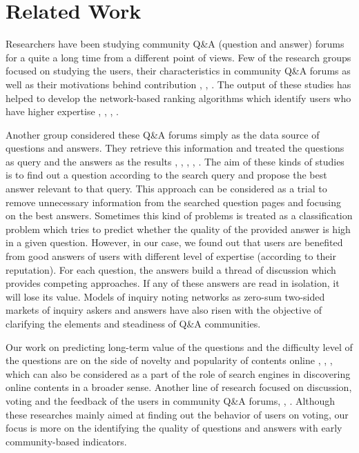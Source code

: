 \section{Related Work}
Researchers have been studying community Q\&A (question and answer) forums for a quite a long time from a different point of views. Few of the research groups focused on studying the users, their characteristics in community Q\&A forums as well as their motivations behind contribution \cite{adamic2008knowledge}, \cite{preece2004top}, \cite{nam2009questions}. The output of these studies has helped to develop the network-based ranking algorithms which identify users who have higher expertise \cite{jurczyk2007discovering}, \cite{nam2009questions}, \cite{yang2008crowdsourcing}, \cite{zhang2007expertise}.

Another group considered these Q\&A forums simply as the data source of questions and answers. They retrieve this information and treated the questions as query and the answers as the results \cite{liu2011predicting}, \cite{harper2008predictors}, \cite{liu2008predicting}, \cite{agichtein2009modeling}, \cite{jeon2006framework}. The aim of these kinds of studies is to find out a question according to the search query and propose the best answer relevant to that query. This approach can be considered as a trial to remove unnecessary information from the searched question pages and focusing on the best answers. Sometimes this kind of problems is treated as a classification problem which tries to predict whether the quality of the provided answer is high \cite{shah2010evaluating} in a given question. However, in our case, we found out that users are benefited from good answers of users with different level of expertise (according to their reputation). For each question, the answers build a thread of discussion which provides competing approaches. If any of these answers are read in isolation, it will lose its value. Models of inquiry noting networks as zero-sum two-sided markets of inquiry askers and answers have also risen \cite{kumar2010evolution} with the objective of clarifying the elements and steadiness of Q\&A communities.

Our work on predicting long-term value of the questions and the difficulty level of the questions are on the side of novelty and popularity of contents online \cite{wu2007novelty}, \cite{ratkiewicz2010characterizing}, \cite{szabo2010predicting}, which can also be considered as a part of the role of search engines in discovering online contents in a broader sense. Another line of research focused on discussion, voting and the feedback of the users in community Q\&A forums\cite{danescu2009opinions}, \cite{leskovec2010governance}, \cite{leskovec2010predicting}. Although these researches mainly aimed at finding out the behavior of users on voting, our focus is more on the identifying the quality of questions and answers with early community-based indicators. 


